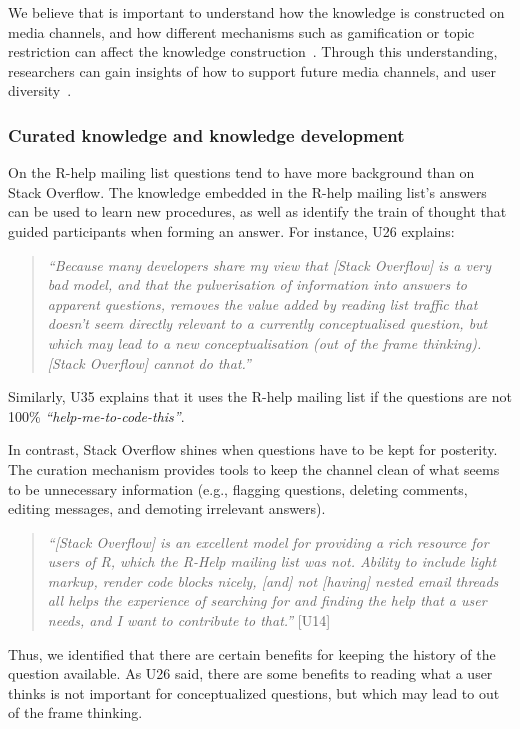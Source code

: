 \documentclass{sig-alternate-05-2015}
\begin{document}
	We believe that is important to understand how the knowledge is constructed on media channels, and how different mechanisms such as gamification or topic restriction can affect the knowledge construction~\cite{Li2015}.
	Through this understanding, researchers can gain insights of how to support future media channels, and user diversity~\cite{Vasilescu2014b}.


	\subsubsection{Curated knowledge and knowledge development}

	On the R-help mailing list questions tend to have more background than on Stack Overflow.
	The knowledge embedded in the R-help mailing list's answers can be used to learn new procedures, as well as identify the train of thought that guided participants when forming an answer.
	For instance, U26 explains:
    \begin{quote}
	    \textit{``Because many developers share my view that [Stack Overflow] is a very bad model, and that the pulverisation of information into answers to apparent questions, removes the value added by reading list traffic that doesn't seem directly relevant to a currently conceptualised question, but which may lead to a new conceptualisation (out of the frame thinking). [Stack Overflow] cannot do that.''}
    \end{quote}
	Similarly, U35 explains that it uses the R-help mailing list if the questions are not 100\% \textit{``help-me-to-code-this''}.

	In contrast, Stack Overflow shines when questions have to be kept for posterity. 
	The curation mechanism provides tools to keep the channel clean of what seems to be unnecessary information (e.g., flagging questions, deleting comments, editing messages, and demoting irrelevant answers).

    \begin{quote}
        \textit{``[Stack Overflow] is an excellent model for providing a rich resource for users of R, which the R-Help mailing list was not. 
        Ability to include light markup, render code blocks nicely, [and] not [having] nested email threads all helps the experience of searching for and finding the help that a user needs, and I want to contribute to that.''} [U14]
	\end{quote}

Thus, we identified that there are certain benefits for keeping the history of the question available.
As U26 said, there are some benefits to reading what a user thinks is not important for conceptualized questions, but which may lead to out of the frame thinking. 
\end{document}
